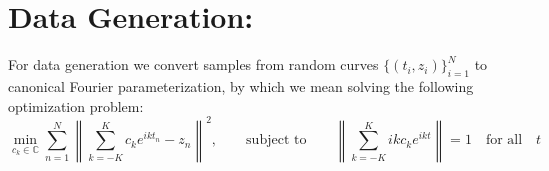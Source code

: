 \documentclass{article}
\begin{document}
    \section{Data Generation:}
    For data generation we convert samples from random curves $\{(t_i, z_i)\}_{i=1}^N$ to canonical Fourier parameterization, by which we mean solving the following optimization problem:
    \[
        \min_{c_k\in \mathbb{C}}\sum_{n=1}^N\left\|\sum_{k=-K}^K c_ke^{ikt_n} - z_n\right\|^2,\qquad \text{subject to}\qquad \left\|\sum_{k=-K}^K ikc_ke^{ikt}\right\|=1\quad \text{for all} \quad t
    \]
\end{document}
